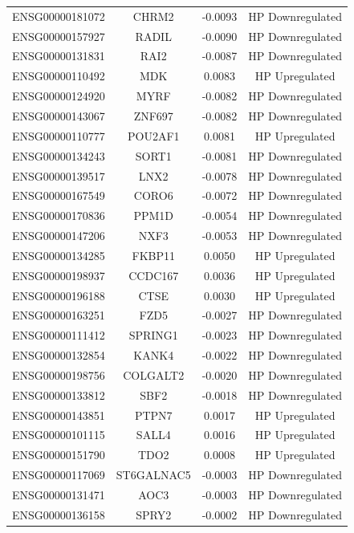 \documentclass[
]{article}
\begin{document}
\begin{singlespace}
\begin{longtable}[t]{lccc}
ENSG00000181072 & CHRM2 & -0.0093 & HP Downregulated\\
\addlinespace
ENSG00000157927 & RADIL & -0.0090 & HP Downregulated\\
ENSG00000131831 & RAI2 & -0.0087 & HP Downregulated\\
ENSG00000110492 & MDK & 0.0083 & HP Upregulated\\
ENSG00000124920 & MYRF & -0.0082 & HP Downregulated\\
ENSG00000143067 & ZNF697 & -0.0082 & HP Downregulated\\
\addlinespace
ENSG00000110777 & POU2AF1 & 0.0081 & HP Upregulated\\
ENSG00000134243 & SORT1 & -0.0081 & HP Downregulated\\
ENSG00000139517 & LNX2 & -0.0078 & HP Downregulated\\
ENSG00000167549 & CORO6 & -0.0072 & HP Downregulated\\
ENSG00000170836 & PPM1D & -0.0054 & HP Downregulated\\
\addlinespace
ENSG00000147206 & NXF3 & -0.0053 & HP Downregulated\\
ENSG00000134285 & FKBP11 & 0.0050 & HP Upregulated\\
ENSG00000198937 & CCDC167 & 0.0036 & HP Upregulated\\
ENSG00000196188 & CTSE & 0.0030 & HP Upregulated\\
ENSG00000163251 & FZD5 & -0.0027 & HP Downregulated\\
\addlinespace
ENSG00000111412 & SPRING1 & -0.0023 & HP Downregulated\\
ENSG00000132854 & KANK4 & -0.0022 & HP Downregulated\\
ENSG00000198756 & COLGALT2 & -0.0020 & HP Downregulated\\
ENSG00000133812 & SBF2 & -0.0018 & HP Downregulated\\
ENSG00000143851 & PTPN7 & 0.0017 & HP Upregulated\\
\addlinespace
ENSG00000101115 & SALL4 & 0.0016 & HP Upregulated\\
ENSG00000151790 & TDO2 & 0.0008 & HP Upregulated\\
ENSG00000117069 & ST6GALNAC5 & -0.0003 & HP Downregulated\\
ENSG00000131471 & AOC3 & -0.0003 & HP Downregulated\\
ENSG00000136158 & SPRY2 & -0.0002 & HP Downregulated\\*
\end{longtable}
\endgroup{}




\end{singlespace}
\end{document}
